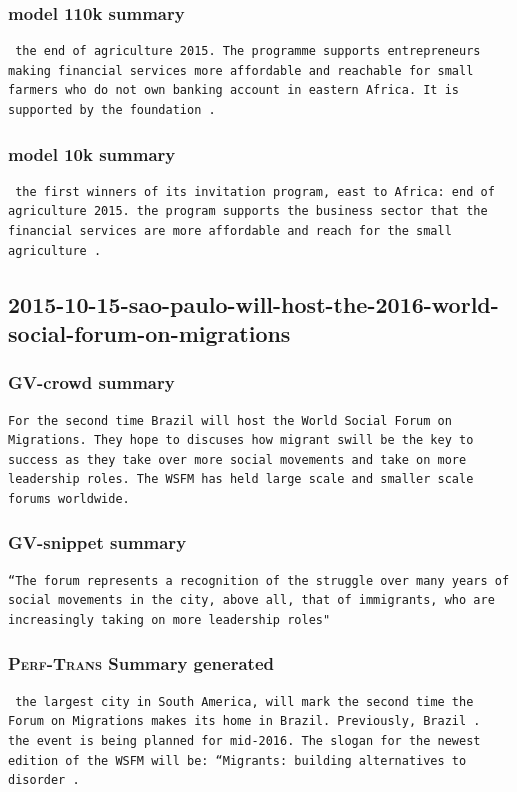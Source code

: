\documentclass[12pt,a4paper,twoside,openright]{report}
\begin{document}
\subsubsection{model 110k summary}
\begin{lstlisting}
 the end of agriculture 2015. The programme supports entrepreneurs making financial services more affordable and reachable for small farmers who do not own banking account in eastern Africa. It is supported by the foundation .

\end{lstlisting}
\subsubsection{model 10k summary}
\begin{lstlisting}
 the first winners of its invitation program, east to Africa: end of agriculture 2015. the program supports the business sector that the financial services are more affordable and reach for the small agriculture .

\end{lstlisting}
\newpage
\subsection*{2015-10-15-sao-paulo-will-host-the-2016-world-social-forum-on-migrations}
\subsubsection{GV-crowd summary}
\begin{lstlisting}
For the second time Brazil will host the World Social Forum on Migrations. They hope to discuses how migrant swill be the key to success as they take over more social movements and take on more leadership roles. The WSFM has held large scale and smaller scale forums worldwide.
\end{lstlisting}
\subsubsection{GV-snippet summary}
\begin{lstlisting}
“The forum represents a recognition of the struggle over many years of social movements in the city, above all, that of immigrants, who are increasingly taking on more leadership roles"
\end{lstlisting}
\subsubsection{\textsc{Perf-Trans} Summary generated}
\begin{lstlisting}
 the largest city in South America, will mark the second time the Forum on Migrations makes its home in Brazil. Previously, Brazil .   the event is being planned for mid-2016. The slogan for the newest edition of the WSFM will be: “Migrants: building alternatives to disorder .

\end{lstlisting}
\end{document}
